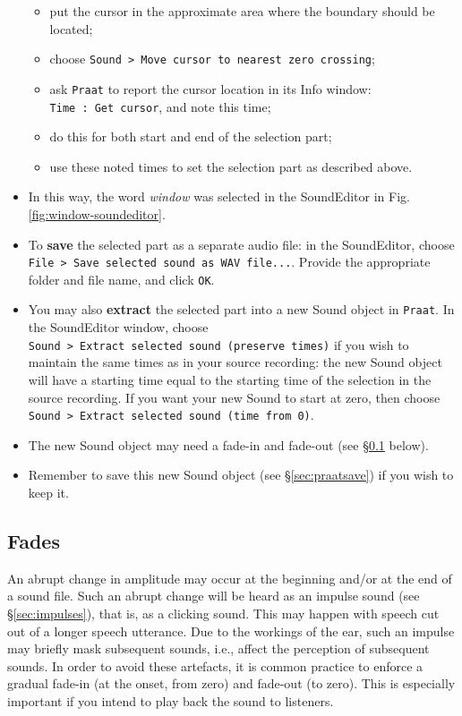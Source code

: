 \documentclass[
]{book}
\providecommand{\tightlist}{%
  \setlength{\itemsep}{0pt}\setlength{\parskip}{0pt}}
\begin{document}
\begin{itemize}
  \begin{itemize}
  \tightlist
  \item
    put the cursor in the approximate area where the boundary should be located;
  \item
    choose \texttt{Sound\ \textgreater{}\ Move\ cursor\ to\ nearest\ zero\ crossing};
  \item
    ask \texttt{Praat} to report the cursor location in its Info window: \texttt{Time\ :\ Get\ cursor}, and note this time;
  \item
    do this for both start and end of the selection part;
  \item
    use these noted times to set the selection part as described above.
  \end{itemize}
\item
  In this way, the word \emph{window} was selected in the SoundEditor in Fig.\ref{fig:window-soundeditor}.
\item
  To \textbf{save} the selected part as a separate audio file: in the SoundEditor, choose \texttt{File\ \textgreater{}\ Save\ selected\ sound\ as\ WAV\ file...}.
  Provide the appropriate folder and file name, and click \texttt{OK}.
\item
  You may also \textbf{extract} the selected part into a new Sound object in \texttt{Praat}. In the SoundEditor window, choose \texttt{Sound\ \textgreater{}\ Extract\ selected\ sound\ (preserve\ times)} if you wish to maintain the same times as in your source recording: the new Sound object will have a starting time equal to the starting time of the selection in the source recording. If you want your new Sound to start at zero, then choose \texttt{Sound\ \textgreater{}\ Extract\ selected\ sound\ (time\ from\ 0)}.
\item
  The new Sound object may need a fade-in and fade-out (see §\ref{sec:fades} below).
\item
  Remember to save this new Sound object (see §\ref{sec:praatsave}) if you wish to keep it.
\end{itemize}

\label{fades}
\subsection{Fades}\label{sec:fades}

An abrupt change in amplitude may occur at the beginning and/or at the end of a sound file. Such an abrupt change will be heard as an impulse sound (see §\ref{sec:impulses}), that is, as a clicking sound. This may happen with speech cut out of a longer speech utterance.
Due to the workings of the ear, such an impulse may briefly mask subsequent sounds, i.e., affect the perception of subsequent sounds. In order to avoid these artefacts, it is common practice to enforce a gradual fade-in (at the onset, from zero) and fade-out (to zero). This is especially important if you intend to play back the sound to listeners.
\end{document}
